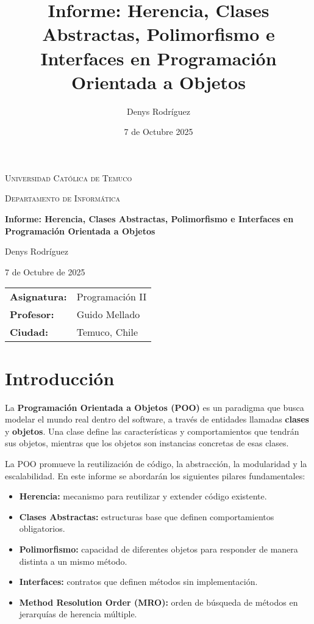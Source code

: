 \documentclass[12pt,a4paper]{article}
\title{\textbf{Informe: Herencia, Clases Abstractas, Polimorfismo e Interfaces en Programación Orientada a Objetos}}
\author{Denys Rodríguez}
\date{7 de Octubre 2025}
\begin{document}
\begin{titlepage}
\centering

{\scshape\Large Universidad Católica de Temuco \par}
{\scshape Departamento de Informática \par}
\vspace{2cm}

{\huge\bfseries Informe: Herencia, Clases Abstractas, Polimorfismo e Interfaces en Programación Orientada a Objetos \par}
\vspace{1cm}
{\Large Denys Rodríguez\par}
\vspace{0.5cm}
{\large 7 de Octubre de 2025\par}
\vspace{2cm}

\vspace{2cm}
\begin{center}
\begin{tabular}{ll}
\textbf{Asignatura:} & Programación II \\[4pt]
\textbf{Profesor:} & Guido Mellado \\[4pt]
\textbf{Ciudad:} & Temuco, Chile \\
\end{tabular}
\end{center}

\vfill

\end{titlepage}


\newpage
\tableo

\section{Introducción}
La \textbf{Programación Orientada a Objetos (POO)} es un paradigma que busca modelar el mundo real dentro del software, a través de entidades llamadas \textbf{clases} y \textbf{objetos}.  
Una clase define las características y comportamientos que tendrán sus objetos, mientras que los objetos son instancias concretas de esas clases.

La POO promueve la reutilización de código, la abstracción, la modularidad y la escalabilidad. En este informe se abordarán los siguientes pilares fundamentales:
\begin{itemize}
    \item \textbf{Herencia:} mecanismo para reutilizar y extender código existente.
    \item \textbf{Clases Abstractas:} estructuras base que definen comportamientos obligatorios.
    \item \textbf{Polimorfismo:} capacidad de diferentes objetos para responder de manera distinta a un mismo método.
    \item \textbf{Interfaces:} contratos que definen métodos sin implementación.
    \item \textbf{Method Resolution Order (MRO):} orden de búsqueda de métodos en jerarquías de herencia múltiple.
\end{itemize}
\end{document}
